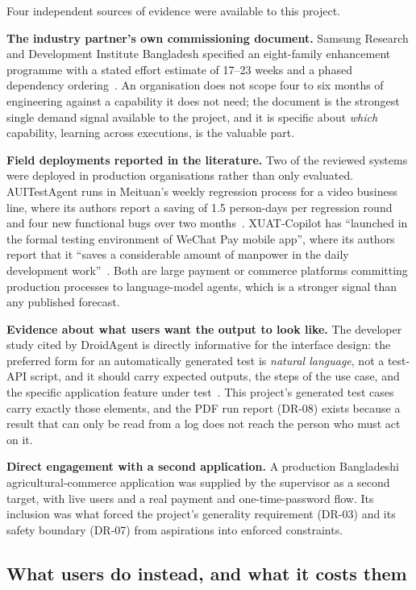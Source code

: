 Four independent sources of evidence were available to this project.

\textbf{The industry partner's own commissioning document.} Samsung Research and
Development Institute Bangladesh specified an eight-family enhancement
programme with a stated effort estimate of 17--23 weeks and a phased dependency
ordering~\cite{etatr}. An organisation does not scope four to six months of
engineering against a capability it does not need; the document is the
strongest single demand signal available to the project, and it is specific
about \emph{which} capability, learning across executions, is the valuable
part.

\textbf{Field deployments reported in the literature.} Two of the reviewed
systems were deployed in production organisations rather than only evaluated.
AUITestAgent runs in Meituan's weekly regression process for a video business
line, where its authors report a saving of 1.5 person-days per regression round
and four new functional bugs over two months~\cite{auitestagent}. XUAT-Copilot
has ``launched in the formal testing environment of WeChat Pay mobile app'',
where its authors report that it ``saves a considerable amount of manpower in
the daily development work''~\cite{xuatcopilot}. Both are large payment or
commerce platforms committing production processes to language-model agents,
which is a stronger signal than any published forecast.

\textbf{Evidence about what users want the output to look like.} The developer
study cited by DroidAgent is directly informative for the interface design: the
preferred form for an automatically generated test is \emph{natural language},
not a test-API script, and it should carry expected outputs, the steps of the
use case, and the specific application feature under test~\cite{droidagent}.
This project's generated test cases carry exactly those elements, and the PDF
run report (DR-08) exists because a result that can only be read from a log
does not reach the person who must act on it.

\textbf{Direct engagement with a second application.} A production Bangladeshi
agricultural-commerce application was supplied by the supervisor as a second
target, with live users and a real payment and one-time-password flow. Its
inclusion was what forced the project's generality requirement (DR-03) and its
safety boundary (DR-07) from aspirations into enforced constraints.

\subsection*{What users do instead, and what it costs them}

